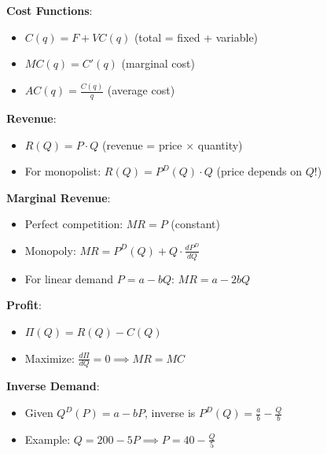 \documentclass[12pt]{article}
\begin{document}
\begin{tcolorbox}[colback=blue!5, colframe=blue!50!black, title=\textbf{Essential Formulas Cheat Sheet}]

\textbf{Cost Functions}:
\begin{itemize}
\item $C(q) = F + VC(q)$ (total = fixed + variable)
\item $MC(q) = C'(q)$ (marginal cost)
\item $AC(q) = \frac{C(q)}{q}$ (average cost)
\end{itemize}

\vspace{0.3cm}

\textbf{Revenue}:
\begin{itemize}
\item $R(Q) = P \cdot Q$ (revenue = price $\times$ quantity)
\item For monopolist: $R(Q) = P^D(Q) \cdot Q$ (price depends on $Q$!)
\end{itemize}

\vspace{0.3cm}

\textbf{Marginal Revenue}:
\begin{itemize}
\item Perfect competition: $MR = P$ (constant)
\item Monopoly: $MR = P^D(Q) + Q \cdot \frac{dP^D}{dQ}$
\item For linear demand $P = a - bQ$: $MR = a - 2bQ$
\end{itemize}

\vspace{0.3cm}

\textbf{Profit}:
\begin{itemize}
\item $\Pi(Q) = R(Q) - C(Q)$
\item Maximize: $\frac{d\Pi}{dQ} = 0 \implies MR = MC$
\end{itemize}

\vspace{0.3cm}

\textbf{Inverse Demand}:
\begin{itemize}
\item Given $Q^D(P) = a - bP$, inverse is $P^D(Q) = \frac{a}{b} - \frac{Q}{b}$
\item Example: $Q = 200 - 5P \implies P = 40 - \frac{Q}{5}$
\end{itemize}

\end{tcolorbox}
\end{document}
